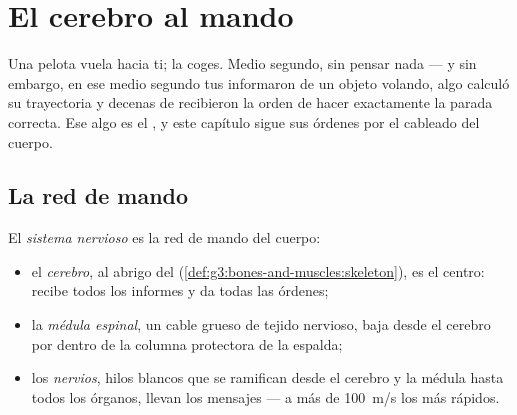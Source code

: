 \chapter{El cerebro al mando}\label{ch:g5:brain-in-command}

Una pelota vuela hacia ti; la coges. Medio segundo, sin pensar nada
--- y sin embargo, en ese medio segundo tus  informaron de un
objeto volando, algo calculó su trayectoria y decenas de 
recibieron la orden de hacer exactamente la parada correcta. Ese algo
es el , y este capítulo sigue sus órdenes por el cableado del
cuerpo.

\section{La red de mando}

\begin{definition}\label{def:g5:brain-in-command:system}
El \emph{sistema nervioso} es la red de mando
del cuerpo:
\begin{itemize}
  \item el \emph{cerebro}, al abrigo del 
        (\cref{def:g3:bones-and-muscles:skeleton}), es el centro:
        recibe todos los informes y da todas las órdenes;
  \item la \emph{médula espinal}, un cable
        grueso de tejido nervioso, baja desde el cerebro por dentro de
        la columna protectora de la espalda;
  \item los \emph{nervios}, hilos blancos que se
        ramifican desde el cerebro y la médula hasta todos los
        órganos, llevan los mensajes --- a más de \qty{100}{m/s} los
        más rápidos.
\end{itemize}
\end{definition}

